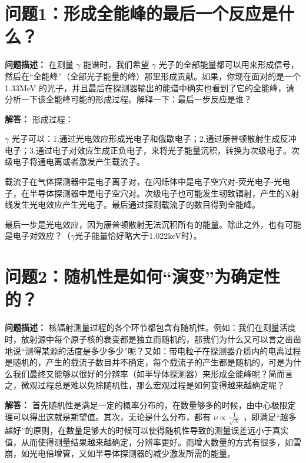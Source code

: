 \documentclass{article}
\begin{document}
\fancyfoot[C]{\thepage}

\tableofcontents
\newpage

\section{问题1：形成全能峰的最后一个反应是什么？}
\label{sec:prob1}

\textbf{问题描述：} 在测量 $\gamma$ 能谱时，我们希望 $\gamma$ 光子的全部能量都可以用来形成信号，然后在“全能峰”（全部光子能量的峰）那里形成贡献。如果，你现在面对的是一个 1.33MeV 的光子，并且最后在探测器输出的能谱中确实也看到了它的全能峰，请分析一下该全能峰可能的形成过程。解释一下：最后一步反应是谁？

\textbf{解答：} 形成过程：

$\gamma$ 光子可以：1.通过光电效应形成光电子和俄歇电子；2.通过康普顿散射生成反冲电子；3.通过电子对效应生成正负电子，来将光子能量沉积，转换为次级电子。次级电子将通电离或者激发产生载流子。

载流子在气体探测器中是电子离子对，在闪烁体中是电子空穴对-荧光电子-光电子，在半导体探测器中是电子空穴对。次级电子也可能发生韧致辐射，产生的X射线发生光电效应产生光电子。最后通过探测载流子的数目得到全能峰。

最后一步是光电效应，因为康普顿散射无法沉积所有的能量。除此之外，也有可能是电子对效应？（$\gamma$光子能量恰好略大于1.022keV时）。

\section{问题2：随机性是如何“演变”为确定性的？}
\label{sec:prob2}

\textbf{问题描述：} 核辐射测量过程的各个环节都包含有随机性。例如：我们在测量活度时，放射源中每个原子核的衰变都是独立而随机的，那我们为什么又可以言之凿凿地说“测得某源的活度是多少多少”呢？又如：带电粒子在探测器介质内的电离过程是随机的，产生的载流子数目并不确定，每个载流子的产生都是随机的，可是为什么我们最终又能够以很好的分辨率（如半导体探测器）来形成全能峰呢？简而言之，微观过程总是难以免除随机性，那么宏观过程是如何变得越来越确定呢？

\textbf{解答：} 首先随机性是满足一定的概率分布的，在数量够多的时候，由中心极限定理可以得出这就是期望值。其次，无论是什么分布，都有 $\nu \propto \frac{1}{\sqrt{N}}$ ，即满足“越多越好”的原则，在数量足够大的时候可以使得随机性导致的测量误差远小于真实值，从而使得测量结果越来越确定，分辨率更好。而增大数量的方式有很多，如雪崩，如光电倍增管，又如半导体探测器的减少激发所需的能量。
\end{document}
